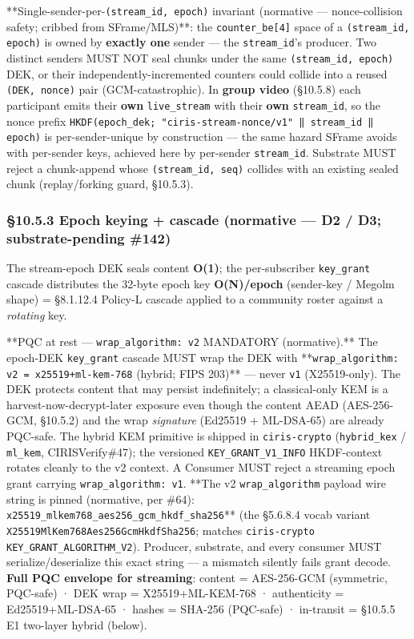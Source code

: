 \documentclass[10pt]{article}
\begin{document}
**Single-sender-per-\texttt{(stream\_id, epoch)} invariant (normative — nonce-collision safety; cribbed from SFrame/MLS)**: the \texttt{counter\_be[4]} space of a \texttt{(stream\_id, epoch)} is owned by \textbf{exactly one} sender — the \texttt{stream\_id}'s producer. Two distinct senders MUST NOT seal chunks under the same \texttt{(stream\_id, epoch)} DEK, or their independently-incremented counters could collide into a reused \texttt{(DEK, nonce)} pair (GCM-catastrophic). In \textbf{group video} (§10.5.8) each participant emits their \textbf{own} \texttt{live\_stream} with their \textbf{own} \texttt{stream\_id}, so the nonce prefix \texttt{HKDF(epoch\_dek; "ciris-stream-nonce/v1" ‖ stream\_id ‖ epoch)} is per-sender-unique by construction — the same hazard SFrame avoids with per-sender keys, achieved here by per-sender \texttt{stream\_id}. Substrate MUST reject a chunk-append whose \texttt{(stream\_id, seq)} collides with an existing sealed chunk (replay/forking guard, §10.5.3).


\subsubsection*{§10.5.3 Epoch keying + cascade (normative — D2 / D3; substrate-pending \#142)}


The stream-epoch DEK seals content \textbf{O(1)}; the per-subscriber \texttt{key\_grant} cascade distributes the 32-byte epoch key \textbf{O(N)/epoch} (sender-key / Megolm shape) = §8.1.12.4 Policy-L cascade applied to a community roster against a \textit{rotating} key.


**PQC at rest — \texttt{wrap\_algorithm: v2} MANDATORY (normative).** The epoch-DEK \texttt{key\_grant} cascade MUST wrap the DEK with **\texttt{wrap\_algorithm: v2 = x25519+ml-kem-768} (hybrid; FIPS 203)** — never \texttt{v1} (X25519-only). The DEK protects content that may persist indefinitely; a classical-only KEM is a harvest-now-decrypt-later exposure even though the content AEAD (AES-256-GCM, §10.5.2) and the wrap \textit{signature} (Ed25519 + ML-DSA-65) are already PQC-safe. The hybrid KEM primitive is shipped in \texttt{ciris-crypto} (\texttt{hybrid\_kex} / \texttt{ml\_kem}, CIRISVerify\#47); the versioned \texttt{KEY\_GRANT\_V1\_INFO} HKDF-context rotates cleanly to the v2 context. A Consumer MUST reject a streaming epoch grant carrying \texttt{wrap\_algorithm: v1}. **The v2 \texttt{wrap\_algorithm} payload wire string is pinned (normative, per \#64): \texttt{x25519\_mlkem768\_aes256\_gcm\_hkdf\_sha256}** (the §5.6.8.4 vocab variant \texttt{X25519MlKem768Aes256GcmHkdfSha256}; matches \texttt{ciris-crypto} \texttt{KEY\_GRANT\_ALGORITHM\_V2}). Producer, substrate, and every consumer MUST serialize/deserialize this exact string — a mismatch silently fails grant decode. \textbf{Full PQC envelope for streaming}: content = AES-256-GCM (symmetric, PQC-safe) · DEK wrap = X25519+ML-KEM-768 · authenticity = Ed25519+ML-DSA-65 · hashes = SHA-256 (PQC-safe) · in-transit = §10.5.5 E1 two-layer hybrid (below).
\end{document}
